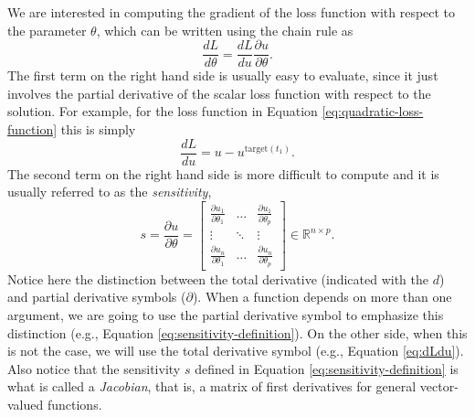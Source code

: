 We are interested in computing the gradient of the loss function with respect to the parameter $\theta$, which can be written using the chain rule as
\begin{equation} 
 \frac{dL}{d\theta} = \frac{dL}{du} \frac{\partial u}{\partial \theta}.
 \label{eq:dLdtheta_VJP}
\end{equation} 
The first term on the right hand side is usually easy to evaluate, since it just involves the partial derivative of the scalar loss function with respect to the solution.
For example, for the loss function in Equation \eqref{eq:quadratic-loss-function} this is simply
\begin{equation}
    \frac{dL}{du} = u - u^{\text{target}(t_1)}.
    \label{eq:dLdu}
\end{equation}
The second term on the right hand side is more difficult to compute and it is usually referred to as the \textit{sensitivity},
\begin{equation}
 s 
 = 
 \frac{\partial u}{\partial \theta} 
 =
 \begin{bmatrix}
   \frac{\partial u_1}{\partial \theta_1} & \dots & \frac{\partial u_1}{\partial \theta_p} \\
   \vdots & \ddots & \vdots \\
   \frac{\partial u_n}{\partial \theta_1} & \dots & \frac{\partial u_n}{\partial \theta_p}
 \end{bmatrix}
 \in \mathbb R^{n \times p}.
 \label{eq:sensitivity-definition}
\end{equation}
Notice here the distinction between the total derivative (indicated with the $d$) and partial derivative symbols ($\partial$). 
When a function depends on more than one argument, we are going to use the partial derivative symbol to emphasize this distinction (e.g., Equation \eqref{eq:sensitivity-definition}). 
On the other side, when this is not the case, we will use the total derivative symbol (e.g., Equation \eqref{eq:dLdu}).
Also notice that the sensitivity $s$ defined in Equation \eqref{eq:sensitivity-definition} is what is called a \textit{Jacobian}, that is, a matrix of first derivatives for general vector-valued functions.

